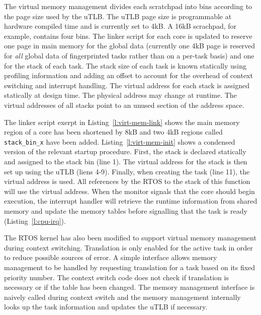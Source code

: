 The virtual memory management divides each scratchpad into bins according to the page size used by the uTLB. The uTLB page size is programmable at hardware compiled time and is currently set to 4kB. A 16kB scrachpad, for example, contains four bins.  The linker script for each core is updated to reserve one page in main memory for the global data (currently one 4kB page is reserved for \emph{all} global data of fingerprinted tasks rather than on a per-task basis) and one for the stack of each task. The stack size of each task is known statically using profiling information and adding an offset to account for the overhead of context switching and interrupt handling. The virtual address for each stack is assigned statically at design time. The physical address may change at runtime. The virtual addresses of all stacks point to an unused section of the address space.

The linker script exerpt in Listing~\ref{l:virt-mem-link} shows the main memory region of a core has been shortened by 8kB and two 4kB regions called \texttt{stack\_bin\_x} have been added. Listing~\ref{l:virt-mem-init} shows a condensed version of the relevant startup procedure. First, the stack is declared statically and assigned to the stack bin (line 1). The virtual address for the stack is then set up using the uTLB (liens 4-9). Finally, when creating the task (line 11), the virtual address is used. All references by the RTOS to the stack of this function will use the virtual address. When the monitor signals that the core should begin execution, the interrupt handler will retrieve the runtime information from shared memory and update the memory tables before signalling that the task is ready (Listing~\ref{l:cpu-irq}).


The RTOS kernel has also been modified to support virtual memory management during context switching. Translation is only enabled for the active task in order to reduce possible sources of error. A simple interface allows memory management to be handled by requesting translation for a task based on its fixed priority number. The context switch code does not check if translation is necessary or if the table has been changed. The memory management interface is naively called during context switch and the memory management internally looks up the task information and updates the uTLB if necessary.

